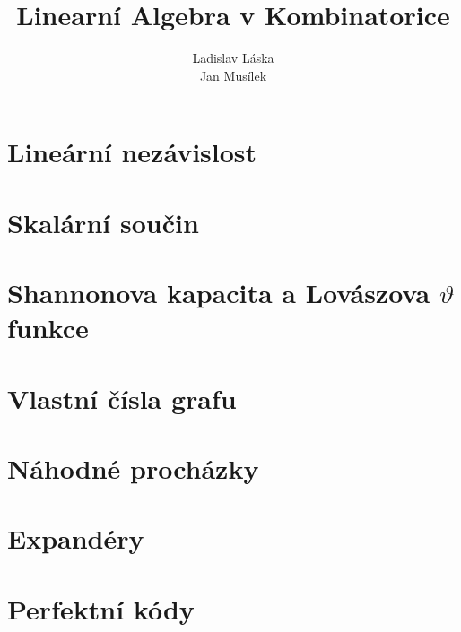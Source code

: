 \documentclass[a4paper,12pt,titlepage]{article}
\title{Linearní Algebra v Kombinatorice}
\author{Ladislav Láska\\ Jan Musílek}
\begin{document}
\maketitle
\newpage
\tableofcontents
\newpage


\section{Lineární nezávislost}



\medskip


\medskip



\section{Skalární součin}





\section{Shannonova kapacita a Lovászova $\vartheta$ funkce}





\section{Vlastní čísla grafu}







\section{Náhodné procházky}





\section{Expandéry}






\section{Perfektní kódy}
\end{document}
